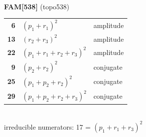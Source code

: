 \documentclass[10pt]{article}
\begin{document}
\begin{minipage}[t]{0.48\textwidth}
{}\\[2mm]\textbf{FAM[538]} (topo538)\\[2pt]{\footnotesize\begin{tabular}{@{}r@{\ \ }l@{\ \ }l@{}}\textbf{6} & $(p_1+r_1)^2$ & amplitude\\
\textbf{13} & $(r_2+r_3)^2$ & amplitude\\
\textbf{22} & $(p_1+r_1+r_2+r_3)^2$ & amplitude\\
\textbf{9} & $(p_2+r_2)^2$ & conjugate\\
\textbf{25} & $(p_1+p_2+r_2)^2$ & conjugate\\
\textbf{29} & $(p_1+p_2+r_2+r_3)^2$ & conjugate\\\end{tabular}}\\[2pt]{\scriptsize irreducible numerators: 17 = $(p_1+r_1+r_3)^2$}\end{minipage}

\bigskip
\end{document}
